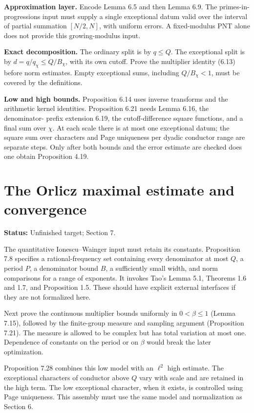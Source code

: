 \documentclass[11pt]{article}
\newcommand{\status}[1]{\textbf{Status:} #1.}
\newcommand{\page}{\newpage}
\begin{document}
\textbf{Approximation layer.} Encode Lemma 6.5 and then Lemma 6.9. The primes-in-
progressions input must supply a single exceptional datum valid over the interval
of partial summation \([N/2,N]\), with uniform errors. A fixed-modulus PNT alone
does not provide this growing-modulus input.

\textbf{Exact decomposition.} The ordinary split is by \(q\le Q\). The exceptional
split is by \(d=q/q_\chi\le Q/B_\chi\), with its own cutoff. Prove the multiplier
identity (6.13) before norm estimates. Empty exceptional sums, including
\(Q/B_\chi<1\), must be covered by the definitions.

\textbf{Low and high bounds.} Proposition 6.14 uses inverse transforms and the
arithmetic kernel identities. Proposition 6.21 needs Lemma 6.16, the denominator-
prefix extension 6.19, the cutoff-difference square functions, and a final sum
over \(\chi\). At each scale there is at most one exceptional datum; the square
sum over characters and Page uniqueness per dyadic conductor range are separate
steps. Only after both bounds and the error estimate are checked does one obtain
Proposition 4.19.

\page
\section{The Orlicz maximal estimate and convergence}
\status{Unfinished target; Section 7}

The quantitative Ionescu--Wainger input must retain its constants. Proposition
7.8 specifies a rational-frequency set containing every denominator at most \(Q\),
a period \(P\), a denominator bound \(B\), a sufficiently small width, and norm
comparisons for a range of exponents. It invokes Tao's Lemma 5.1, Theorems 1.6
and 1.7, and Proposition 1.5. These should have explicit external interfaces if
they are not formalized here.

Next prove the continuous multiplier bounds uniformly in \(0<\beta\le1\)
(Lemma 7.15), followed by the finite-group measure and sampling argument
(Proposition 7.21). The measure is allowed to be complex but has total variation
at most one. Dependence of constants on the period or on \(\beta\) would break
the later optimization.

Proposition 7.28 combines this low model with an \(\ell^2\) high estimate. The
exceptional characters of conductor above \(Q\) vary with scale and are retained
in the high term. The low exceptional character, when it exists, is controlled
using Page uniqueness. This assembly must use the same model and normalization
as Section 6.
\end{document}
